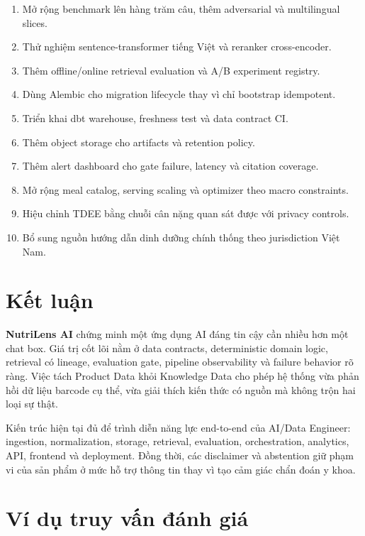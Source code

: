 \documentclass[12pt,a4paper]{report}
\newcommand{\project}{\textbf{NutriLens AI}}
\begin{document}
\begin{enumerate}
  \item Mở rộng benchmark lên hàng trăm câu, thêm adversarial và multilingual slices.
  \item Thử nghiệm sentence-transformer tiếng Việt và reranker cross-encoder.
  \item Thêm offline/online retrieval evaluation và A/B experiment registry.
  \item Dùng Alembic cho migration lifecycle thay vì chỉ bootstrap idempotent.
  \item Triển khai dbt warehouse, freshness test và data contract CI.
  \item Thêm object storage cho artifacts và retention policy.
  \item Thêm alert dashboard cho gate failure, latency và citation coverage.
  \item Mở rộng meal catalog, serving scaling và optimizer theo macro constraints.
  \item Hiệu chỉnh TDEE bằng chuỗi cân nặng quan sát được với privacy controls.
  \item Bổ sung nguồn hướng dẫn dinh dưỡng chính thống theo jurisdiction Việt Nam.
\end{enumerate}

\chapter{Kết luận}

\project{} chứng minh một ứng dụng AI đáng tin cậy cần nhiều hơn một chat box.
Giá trị cốt lõi nằm ở data contracts, deterministic domain logic, retrieval có
lineage, evaluation gate, pipeline observability và failure behavior rõ ràng.
Việc tách Product Data khỏi Knowledge Data cho phép hệ thống vừa phản hồi dữ
liệu barcode cụ thể, vừa giải thích kiến thức có nguồn mà không trộn hai loại
sự thật.

Kiến trúc hiện tại đủ để trình diễn năng lực end-to-end của AI/Data Engineer:
ingestion, normalization, storage, retrieval, evaluation, orchestration,
analytics, API, frontend và deployment. Đồng thời, các disclaimer và abstention
giữ phạm vi của sản phẩm ở mức hỗ trợ thông tin thay vì tạo cảm giác chẩn đoán
y khoa.

\appendix
\chapter{Ví dụ truy vấn đánh giá}
\end{document}
